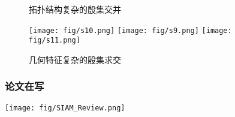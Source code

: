 \documentclass[UTF8]{ctexbeamer}	%
\theoremstyle{plain}
\theoremstyle{definition}
\theoremstyle{remark}
\numberwithin{equation}{section}
\begin{document}
\begin{frame}
    \begin{figure}[!htb]
        \centering
         \qquad
        \vspace{-0.05in}
        \caption{拓扑结构复杂的殷集交并}
        \vspace{-0.1in}
    \end{figure}
    \begin{figure}[!htb]
        \centering
        \subfigure
        {\texttt{[image: fig/s10.png]}} \quad
        \subfigure
        {\texttt{[image: fig/s9.png]}} \quad
        \subfigure
        {\texttt{[image: fig/s11.png]}}
        \vspace{-0.05in}
        \caption{几何特征复杂的殷集求交}
    \end{figure}
\end{frame}

\begin{frame}
    \frametitle{论文在写}
    \centering
    \texttt{[image: fig/SIAM\_Review.png]}
\end{frame}
\end{document}
